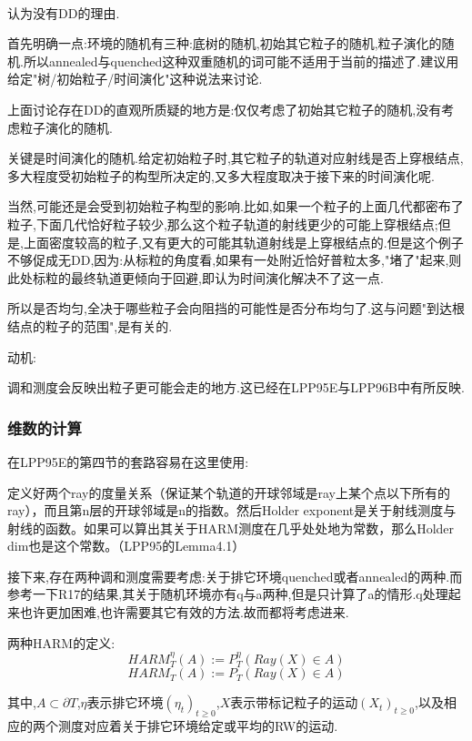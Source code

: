 \documentclass[a4paper,oneside]{ctexbook}
\begin{document}
				\begin{conjec}
					\ 

					认为没有DD的理由.

					首先明确一点:环境的随机有三种:底树的随机,初始其它粒子的随机,粒子演化的随机.所以annealed与quenched这种双重随机的词可能不适用于当前的描述了.建议用给定"树/初始粒子/时间演化"这种说法来讨论.

					上面讨论存在DD的直观所质疑的地方是:仅仅考虑了初始其它粒子的随机,没有考虑粒子演化的随机.					

					关键是时间演化的随机.给定初始粒子时,其它粒子的轨道对应射线是否上穿根结点,多大程度受初始粒子的构型所决定的,又多大程度取决于接下来的时间演化呢.

					当然,可能还是会受到初始粒子构型的影响.比如,如果一个粒子的上面几代都密布了粒子,下面几代恰好粒子较少,那么这个粒子轨道的射线更少的可能上穿根结点;但是,上面密度较高的粒子,又有更大的可能其轨道射线是上穿根结点的.但是这个例子不够促成无DD,因为:从标粒的角度看,如果有一处附近恰好普粒太多,"堵了"起来,则此处标粒的最终轨道更倾向于回避,即认为时间演化解决不了这一点.

					所以是否均匀,全决于哪些粒子会向阻挡的可能性是否分布均匀了.这与问题"到达根结点的粒子的范围",是有关的.
				\end{conjec}

			动机:

				调和测度会反映出粒子更可能会走的地方.这已经在LPP95E与LPP96B中有所反映.



		\subsubsection*{维数的计算}

			在LPP95E的第四节的套路容易在这里使用:

			定义好两个ray的度量关系（保证某个轨道的开球邻域是ray上某个点以下所有的ray），而且第n层的开球邻域是n的指数。然后Holder exponent是关于射线测度与射线的函数。如果可以算出其关于HARM测度在几乎处处地为常数，那么Holder dim也是这个常数。（LPP95的Lemma4.1）

			接下来,存在两种调和测度需要考虑:关于排它环境quenched或者annealed的两种.而参考一下R17的结果,其关于随机环境亦有q与a两种,但是只计算了a的情形.q处理起来也许更加困难,也许需要其它有效的方法.故而都将考虑进来.

			两种HARM的定义:
			$$HARM^{\eta}_T(A) := P^{\eta}_T(Ray(X)\in A)$$
			$$HARM_T(A) := P_T(Ray(X)\in A)$$

			其中,$A \subset \partial T$,$\eta$表示排它环境$(\eta_t)_{t \ge 0}$,$X$表示带标记粒子的运动$(X_t)_{t \ge 0}$,以及相应的两个测度对应着关于排它环境给定或平均的RW的运动.
\end{document}
